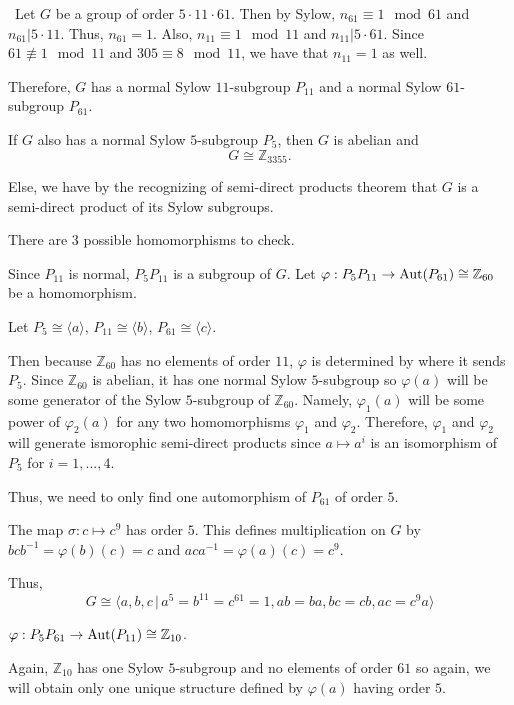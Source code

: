 \documentclass[12pt]{Qual}
\begin{document}
\begin{solution}$\,$
Let $G$ be a group of order $5\cdot 11\cdot 61.$ Then by Sylow, $n_{61}\equiv 1\mod 61$ and $n_{61}|5\cdot 11$. Thus, $n_{61}=1$. Also, $n_{11}\equiv 1\mod 11$ and $n_{11}|5\cdot 61$. Since $61\not\equiv 1\mod 11$ and $305\equiv 8\mod 11$, we have that $n_{11}=1$ as well.

Therefore, $G$ has a normal Sylow $11$-subgroup $P_{11}$ and a normal Sylow $61$-subgroup $P_{61}$.

 If $G$ also has a normal Sylow $5$-subgroup $P_5$, then $G$ is abelian and $$G\cong\mathbb{Z}_{3355}.$$

Else, we have by the recognizing of semi-direct products theorem that $G$ is a semi-direct product of its Sylow subgroups.

There are $3$ possible homomorphisms to check.

 Since $P_{11}$ is normal, $P_5P_{11}$ is a subgroup of $G$. Let $\varphi:P_5P_{11}\to\text{Aut}(P_{61})\cong\mathbb{Z}_{60}$ be a homomorphism.

Let $P_5\cong\langle a\rangle$, $P_{11}\cong\langle b\rangle$, $P_{61}\cong\langle c\rangle.$

Then because $\mathbb{Z}_{60}$ has no elements of order $11$, $\varphi$ is determined by where it sends $P_5$. Since $\mathbb{Z}_{60}$ is abelian, it has one normal Sylow $5$-subgroup so $\varphi(a)$ will be some generator of the Sylow $5$-subgroup of $\mathbb{Z}_{60}$. Namely, $\varphi_1(a)$ will be some power of $\varphi_2(a)$ for any two homomorphisms $\varphi_1$ and $\varphi_2$. Therefore, $\varphi_1$ and $\varphi_2$ will generate ismorophic semi-direct products since $a\mapsto a^i$ is an isomorphism of $P_5$ for $i=1,...,4$.

Thus, we need to only find one automorphism of $P_{61}$ of order $5.$

The map $\sigma:c\mapsto c^9$ has order $5$. This defines multiplication on $G$ by $bcb^{-1}=\varphi(b)(c)=c$ and $aca^{-1}=\varphi(a)(c)=c^9$.

Thus, $$G\cong\langle a,b,c\,|\, a^5=b^{11}=c^{61}=1,ab=ba,bc=cb,ac=c^9a\rangle$$

 $\varphi:P_5P_{61}\to\text{Aut}(P_{11})\cong \mathbb{Z}_{10}$.

Again, $\mathbb{Z}_{10}$ has one Sylow $5$-subgroup and no elements of order $61$ so again, we will obtain only one unique structure defined by $\varphi(a)$ having order $5$.


\end{solution}
\end{document}
